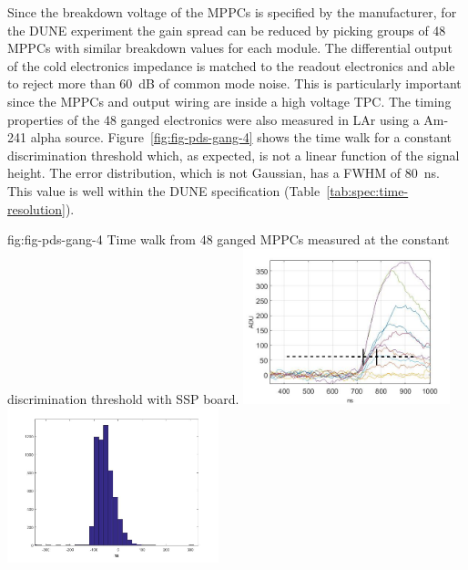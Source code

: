 Since the breakdown voltage of the MPPCs is specified by the manufacturer, for the DUNE experiment the gain spread can be reduced by picking groups of 48 MPPCs with similar breakdown values for each module. The differential output of the cold electronics impedance is matched to the readout electronics and able to reject more than \SI{60}{dB} of common mode noise. This is particularly important since the MPPCs and output wiring are inside a high voltage TPC. The timing properties of the 48 ganged electronics were also measured 
in LAr using a Am-241 alpha source. 
Figure~\ref{fig:fig-pds-gang-4} shows the time walk for a constant discrimination threshold which, 
as expected, is not a linear function of the signal height. The error distribution, which is not Gaussian, has a FWHM of \SI{80}{ns}. This value is well within the DUNE specification (Table~\ref{tab:spec:time-resolution}).

\begin{dunefigure}
 {fig:fig-pds-gang-4}
 {Time walk from 48 ganged MPPCs measured at the constant discrimination threshold with SSP board.}
\includegraphics[height=4.5cm]{graphics/pds-gang-time_walk.jpg}
\includegraphics[height=4.5cm]{graphics/pds_gang_fig8.jpg}
\end{dunefigure}


